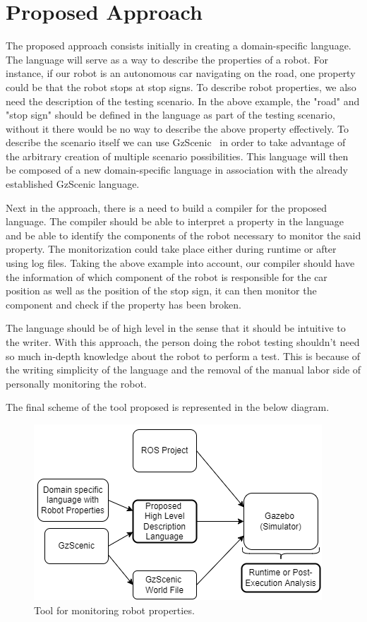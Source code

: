 \chapter{Proposed Approach}
\label{chap:approach}


The proposed approach consists initially in creating a domain-specific language.
The language will serve as a way to describe the properties of a robot.
For instance, if our robot is an autonomous car navigating on the road, 
one property could be that the robot stops at stop signs.
To describe robot properties, we also need the description of the testing scenario.
In the above example, the "road" and "stop sign" should be defined in the language as part of the 
testing scenario, without it there would be no way to describe the above property effectively.
To describe the scenario itself we can use GzScenic~\cite{GzScenic} in order to take 
advantage of the arbitrary creation of multiple scenario possibilities.
This language will then be composed of a new domain-specific language in association 
with the already established GzScenic language.

\par

Next in the approach, there is a need to build a compiler for the proposed language.
The compiler should be able to interpret a property in the language and be able to
identify the components of the robot necessary to monitor the said property.
The monitorization could take place either during runtime or after using log files.
Taking the above example into account, our compiler should have the information of which 
component of the robot is responsible for the car position as well as the position of the 
stop sign, it can then monitor the component and check if the property has been broken.

\par

The language should be of high level in the sense that it should be intuitive to the writer.
With this approach, the person doing the robot testing shouldn't need so much in-depth 
knowledge about the robot to perform a test. This is because of the writing simplicity of 
the language and the removal of the manual labor side of personally monitoring the robot.

\par

The final scheme of the tool proposed is represented in the below diagram.

\begin{figure}[h!]
    \includegraphics{images/intro_diag.png}
    \caption{Tool for monitoring robot properties.}
    \label{fig:intro_objectives}
\end{figure}